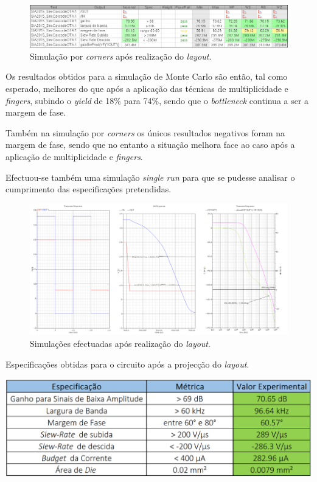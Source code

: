 \documentclass[11pt]{article}
\numberwithin{equation}{section}
\begin{document}
\begin{figure}[H]
	\centering
	\includegraphics[keepaspectratio=true, scale=0.50]{exps/Corners_Novo_Layout}
	\vspace{-0.5em}
	\caption{Simulação por \textit{corners} após realização do \textit{layout}.}
	\vspace{-0.8em} 
\end{figure}

Os resultados obtidos para a simulação de Monte Carlo são então, tal como esperado, melhores do que após a aplicação das técnicas de multiplicidade e \textit{fingers}, subindo o \textit{yield} de 18\% para 74\%, sendo que o \textit{bottleneck} continua a ser a margem de fase.

Também na simulação por \textit{corners} os únicos resultados negativos foram na margem de fase, sendo que no entanto a situação melhora face ao caso após  a aplicação de multiplicidade e \textit{fingers}.

Efectuou-se também uma simulação \textit{single run} para que se pudesse analisar o cumprimento das especificações pretendidas.

\begin{figure}[H]
	\centering
	\includegraphics[keepaspectratio=true, scale=0.25]{exps/GraficosDoLayout}
	\vspace{-0.5em}
	\caption{Simulações efectuadas após realização do \textit{layout}.}
	\vspace{-0.8em} 
\end{figure}

\begin{table}[H]
	\centering
	\caption{Especificações obtidas para o circuito após a projecção do \textit{layout}.}
	\vspace{-1.5mm}
	\includegraphics[keepaspectratio=true, scale=0.35]{teoricas/specsfinalLayout}
\end{table}
\end{document}

